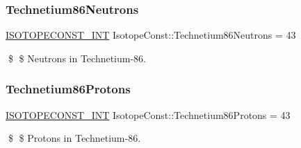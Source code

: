 \subsubsection{\texorpdfstring{Technetium86\+Neutrons}{Technetium86Neutrons}}
{\footnotesize\ttfamily \mbox{\hyperlink{group___isotope_const-_macros_ga5f18360b3e99483a35c32d789e62621c}{I\+S\+O\+T\+O\+P\+E\+C\+O\+N\+S\+T\+\_\+\+I\+NT}} Isotope\+Const\+::\+Technetium86\+Neutrons = 43}

\$ \$ Neutrons in Technetium-\/86. \mbox{\label{group___isotope_const-_technetium-_tc86_ga79834892ed66cc354290f5a6928620fc}} 
\subsubsection{\texorpdfstring{Technetium86\+Protons}{Technetium86Protons}}
{\footnotesize\ttfamily \mbox{\hyperlink{group___isotope_const-_macros_ga5f18360b3e99483a35c32d789e62621c}{I\+S\+O\+T\+O\+P\+E\+C\+O\+N\+S\+T\+\_\+\+I\+NT}} Isotope\+Const\+::\+Technetium86\+Protons = 43}

\$ \$ Protons in Technetium-\/86. 